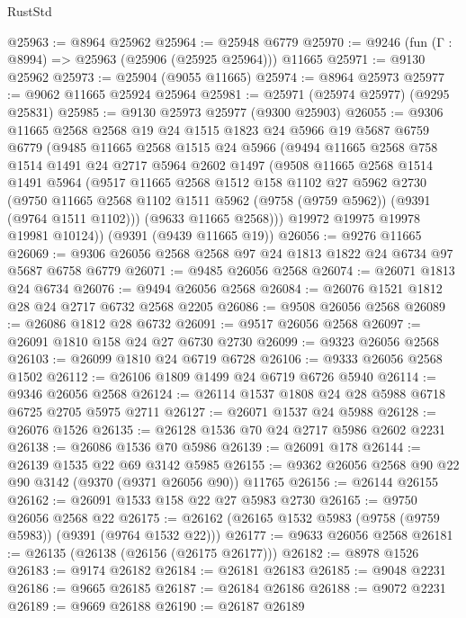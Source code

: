 \begin{lexlean}{RustStd}
\begin{coremodule}
@25963 := @8964 @25962
@25964 := @25948 @6779
@25970 := @9246 (fun (Γ : @8994) => @25963 (@25906 (@25925 @25964))) @11665
@25971 := @9130 @25962
@25973 := @25904 (@9055 @11665)
@25974 := @8964 @25973
@25977 := @9062 @11665 @25924 @25964
@25981 := @25971 (@25974 @25977) (@9295 @25831)
@25985 := @9130 @25973 @25977 (@9300 @25903)
@26055 := @9306
    @11665
    @2568
    @2568
    @19
    @24
    @1515
    @1823
    @24
    @5966
    @19
    @5687
    @6759
    @6779
    (@9485
      @11665
      @2568
      @1515
      @24
      @5966
      (@9494
        @11665
        @2568
        @758
        @1514
        @1491
        @24
        @2717
        @5964
        @2602
        @1497
        (@9508
          @11665
          @2568
          @1514
          @1491
          @5964
          (@9517
            @11665
            @2568
            @1512
            @158
            @1102
            @27
            @5962
            @2730
            (@9750 @11665 @2568 @1102 @1511 @5962 (@9758 (@9759 @5962)) (@9391 (@9764 @1511 @1102)))
            (@9633 @11665 @2568)))
        @19972
        @19975
        @19978
        @19981
        @10124))
    (@9391 (@9439 @11665 @19))
@26056 := @9276 @11665
@26069 := @9306 @26056 @2568 @2568 @97 @24 @1813 @1822 @24 @6734 @97 @5687 @6758 @6779
@26071 := @9485 @26056 @2568
@26074 := @26071 @1813 @24 @6734
@26076 := @9494 @26056 @2568
@26084 := @26076 @1521 @1812 @28 @24 @2717 @6732 @2568 @2205
@26086 := @9508 @26056 @2568
@26089 := @26086 @1812 @28 @6732
@26091 := @9517 @26056 @2568
@26097 := @26091 @1810 @158 @24 @27 @6730 @2730
@26099 := @9323 @26056 @2568
@26103 := @26099 @1810 @24 @6719 @6728
@26106 := @9333 @26056 @2568 @1502
@26112 := @26106 @1809 @1499 @24 @6719 @6726 @5940
@26114 := @9346 @26056 @2568
@26124 := @26114 @1537 @1808 @24 @28 @5988 @6718 @6725 @2705 @5975 @2711
@26127 := @26071 @1537 @24 @5988
@26128 := @26076 @1526
@26135 := @26128 @1536 @70 @24 @2717 @5986 @2602 @2231
@26138 := @26086 @1536 @70 @5986
@26139 := @26091 @178
@26144 := @26139 @1535 @22 @69 @3142 @5985
@26155 := @9362 @26056 @2568 @90 @22 @90 @3142 (@9370 (@9371 @26056 @90)) @11765
@26156 := @26144 @26155
@26162 := @26091 @1533 @158 @22 @27 @5983 @2730
@26165 := @9750 @26056 @2568 @22
@26175 := @26162 (@26165 @1532 @5983 (@9758 (@9759 @5983)) (@9391 (@9764 @1532 @22)))
@26177 := @9633 @26056 @2568
@26181 := @26135 (@26138 (@26156 (@26175 @26177)))
@26182 := @8978 @1526
@26183 := @9174 @26182
@26184 := @26181 @26183
@26185 := @9048 @2231
@26186 := @9665 @26185
@26187 := @26184 @26186
@26188 := @9072 @2231
@26189 := @9669 @26188
@26190 := @26187 @26189

\end{coremodule}
\end{lexlean}
